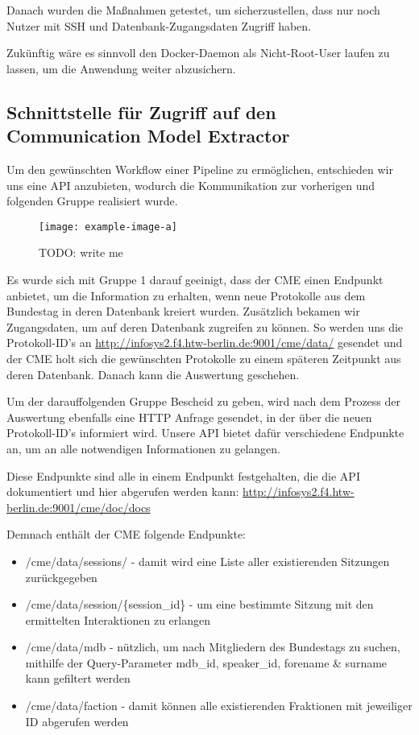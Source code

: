 Danach wurden die Maßnahmen getestet, um sicherzustellen, dass nur noch
Nutzer mit SSH und Datenbank-Zugangsdaten Zugriff haben.

Zukünftig wäre es sinnvoll den Docker-Daemon als Nicht-Root-User laufen zu
lassen, um die Anwendung weiter abzusichern.

\subsection{Schnittstelle für Zugriff auf den Communication Model Extractor}

Um den gewünschten Workflow einer Pipeline zu ermöglichen, entschieden wir
uns eine API anzubieten, wodurch die Kommunikation zur vorherigen und
folgenden Gruppe realisiert wurde.

\begin{figure}[ht]
    \begin{center}
        \texttt{[image: example-image-a]}
    \end{center}
    \caption{TODO: write me}
    \label{fig:03_api_call_flow}
\end{figure}

Es wurde sich mit Gruppe 1 darauf geeinigt, dass der CME einen Endpunkt
anbietet, um die Information zu erhalten, wenn neue Protokolle aus dem
Bundestag in deren Datenbank kreiert wurden. Zusätzlich bekamen wir
Zugangsdaten, um auf deren Datenbank zugreifen zu können. So werden uns die
Protokoll-ID's an \url{http://infosys2.f4.htw-berlin.de:9001/cme/data/} gesendet
und der CME holt sich die gewünschten Protokolle zu einem späteren Zeitpunkt
aus deren Datenbank. Danach kann die Auswertung geschehen.

Um der darauffolgenden Gruppe Bescheid zu geben, wird nach dem Prozess der
Auswertung ebenfalls eine HTTP Anfrage gesendet, in der über die neuen
Protokoll-ID's informiert wird. Unsere API bietet dafür verschiedene Endpunkte
an, um an alle notwendigen Informationen zu gelangen.

Diese Endpunkte sind alle in einem Endpunkt festgehalten, die die API
dokumentiert und hier abgerufen werden kann:
\url{http://infosys2.f4.htw-berlin.de:9001/cme/doc/docs}

Demnach enthält der CME folgende Endpunkte:
\begin{itemize}
    \item /cme/data/sessions/ - damit wird eine Liste aller existierenden
        Sitzungen zurückgegeben
    \item /cme/data/session/\{session\_id\} - um eine bestimmte Sitzung mit den
        ermittelten Interaktionen zu erlangen
    \item /cme/data/mdb - nützlich, um nach Mitgliedern des Bundestags zu
        suchen, mithilfe der Query-Parameter mdb\_id, speaker\_id, forename
        \& surname kann gefiltert werden
    \item /cme/data/faction - damit können alle existierenden Fraktionen mit
        jeweiliger ID abgerufen werden
\end{itemize}

